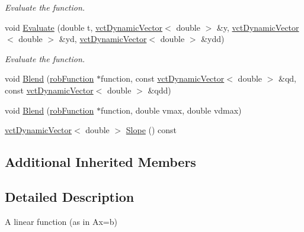 \begin{DoxyCompactItemize}
\begin{DoxyCompactList}\small\item\em Evaluate the function. \end{DoxyCompactList}\item 
void \hyperlink{classrob_linear_rn_a44d7200fe3a9a71640c3fbbaf6e597bf}{Evaluate} (double t, \hyperlink{classvct_dynamic_vector}{vct\-Dynamic\-Vector}$<$ double $>$ \&y, \hyperlink{classvct_dynamic_vector}{vct\-Dynamic\-Vector}$<$ double $>$ \&yd, \hyperlink{classvct_dynamic_vector}{vct\-Dynamic\-Vector}$<$ double $>$ \&ydd)
\begin{DoxyCompactList}\small\item\em Evaluate the function. \end{DoxyCompactList}\item 
void \hyperlink{classrob_linear_rn_a9ae5c744e72423e4140f6138bb3a6123}{Blend} (\hyperlink{classrob_function}{rob\-Function} $\ast$function, const \hyperlink{classvct_dynamic_vector}{vct\-Dynamic\-Vector}$<$ double $>$ \&qd, const \hyperlink{classvct_dynamic_vector}{vct\-Dynamic\-Vector}$<$ double $>$ \&qdd)
\item 
void \hyperlink{classrob_linear_rn_a445a28f3de29309411ed11546b02841a}{Blend} (\hyperlink{classrob_function}{rob\-Function} $\ast$function, double vmax, double vdmax)
\item 
\hyperlink{classvct_dynamic_vector}{vct\-Dynamic\-Vector}$<$ double $>$ \hyperlink{classrob_linear_rn_aa1edb8aba4f443ad31771a9f1cba0d86}{Slope} () const 
\end{DoxyCompactItemize}
\subsection*{Additional Inherited Members}


\subsection{Detailed Description}
A linear function (as in Ax=b) 

